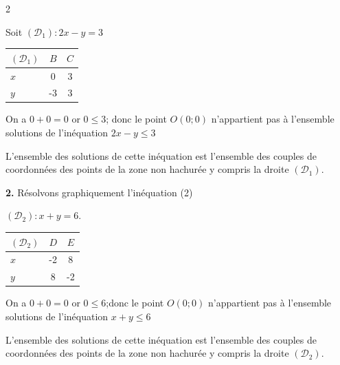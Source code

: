 \begin{multicols*}{2}
  	\begin{minipage}{3.4cm}
  		Soit $(\mathcal{D}_{1}): 2x-y=3$   
  		
  		\begin{tabular}{|l|c|c|}
  			\hline
  			$(\mathcal{D}_{1})$ & $B$ & $C$ \\
  			\hline
  			$x$ & 0 & 3\\ 
  			\hline
  			$y$ & -3 & 3\\
  			\hline 
  		\end{tabular} 
  	\end{minipage}
  	\begin{minipage}{5cm}
  		On a $0+0=0$ or $0\leqslant 3$; donc le point $O(0;0)$ n'appartient pas à l'ensemble solutions de l'inéquation $2x-y\leqslant3 $
  	\end{minipage}
  	L'ensemble des solutions de cette inéquation est l'ensemble des couples de coordonnées des points de la zone non hachurée y compris la droite  $(\mathcal{D}_{1})$.
  	
  	
  	\textbf{2.} Résolvons graphiquement l'inéquation (2)
  	\begin{minipage}{3.4cm}
  		$(\mathcal{D}_{2}): x+y=6$. 
  		
  		\begin{tabular}{|l|c|c|}
  			\hline
  			$(\mathcal{D}_{2})$ & $D$ & $E$ \\
  			\hline
  			$x$ & -2 & 8\\ 
  			\hline
  			$y$ & 8 & -2\\
  			\hline 
  		\end{tabular} 
  	\end{minipage}
  	\begin{minipage}{5cm}
  		On a $0+0=0$ or $0\leqslant 6$;donc le point $O(0;0)$ n'appartient pas à l'ensemble solutions de  l'inéquation $x+y\leqslant6 $
  	\end{minipage}
  	L'ensemble des solutions de cette inéquation est l'ensemble des couples de coordonnées des points de la zone non hachurée y compris la droite  $(\mathcal{D}_{2})$.
  	

\end{multicols*}
